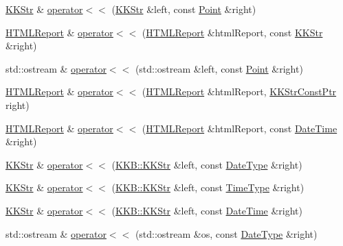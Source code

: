 \begin{DoxyCompactItemize}
\item 
\hyperlink{class_k_k_b_1_1_k_k_str}{K\+K\+Str} \& \hyperlink{namespace_k_k_b_aca6e61811758fc86ba304acdb295cbfb}{operator$<$$<$} (\hyperlink{class_k_k_b_1_1_k_k_str}{K\+K\+Str} \&left, const \hyperlink{class_k_k_b_1_1_point}{Point} \&right)
\item 
\hyperlink{class_k_k_b_1_1_h_t_m_l_report}{H\+T\+M\+L\+Report} \& \hyperlink{namespace_k_k_b_a91d738d10131d4b2f4485ce582fc265e}{operator$<$$<$} (\hyperlink{class_k_k_b_1_1_h_t_m_l_report}{H\+T\+M\+L\+Report} \&html\+Report, const \hyperlink{class_k_k_b_1_1_k_k_str}{K\+K\+Str} \&right)
\item 
std\+::ostream \& \hyperlink{namespace_k_k_b_a9e514450597b55886e67fecb5898b193}{operator$<$$<$} (std\+::ostream \&left, const \hyperlink{class_k_k_b_1_1_point}{Point} \&right)
\item 
\hyperlink{class_k_k_b_1_1_h_t_m_l_report}{H\+T\+M\+L\+Report} \& \hyperlink{namespace_k_k_b_aa5a3069955406a18e8e94b6d070bf509}{operator$<$$<$} (\hyperlink{class_k_k_b_1_1_h_t_m_l_report}{H\+T\+M\+L\+Report} \&html\+Report, \hyperlink{namespace_k_k_b_a46f665ec17615c856eff3d21f78bed5c}{K\+K\+Str\+Const\+Ptr} right)
\item 
\hyperlink{class_k_k_b_1_1_h_t_m_l_report}{H\+T\+M\+L\+Report} \& \hyperlink{namespace_k_k_b_a3984ec43a47925a06858a7643271bde5}{operator$<$$<$} (\hyperlink{class_k_k_b_1_1_h_t_m_l_report}{H\+T\+M\+L\+Report} \&html\+Report, const \hyperlink{class_k_k_b_1_1_date_time}{Date\+Time} \&right)
\item 
\hyperlink{class_k_k_b_1_1_k_k_str}{K\+K\+Str} \& \hyperlink{namespace_k_k_b_a37a7acba943d9b7c59427ad4badbae36}{operator$<$$<$} (\hyperlink{class_k_k_b_1_1_k_k_str}{K\+K\+B\+::\+K\+K\+Str} \&left, const \hyperlink{class_k_k_b_1_1_date_type}{Date\+Type} \&right)
\item 
\hyperlink{class_k_k_b_1_1_k_k_str}{K\+K\+Str} \& \hyperlink{namespace_k_k_b_a314a9d1d21d16d40e2e06ec08804fbf6}{operator$<$$<$} (\hyperlink{class_k_k_b_1_1_k_k_str}{K\+K\+B\+::\+K\+K\+Str} \&left, const \hyperlink{class_k_k_b_1_1_time_type}{Time\+Type} \&right)
\item 
\hyperlink{class_k_k_b_1_1_k_k_str}{K\+K\+Str} \& \hyperlink{namespace_k_k_b_a4874d8129778a98c36dfe823430c5420}{operator$<$$<$} (\hyperlink{class_k_k_b_1_1_k_k_str}{K\+K\+B\+::\+K\+K\+Str} \&left, const \hyperlink{class_k_k_b_1_1_date_time}{Date\+Time} \&right)
\item 
std\+::ostream \& \hyperlink{namespace_k_k_b_a797d72204685a58250b0339b35b8b87d}{operator$<$$<$} (std\+::ostream \&os, const \hyperlink{class_k_k_b_1_1_date_type}{Date\+Type} \&right)

\end{DoxyCompactItemize}
